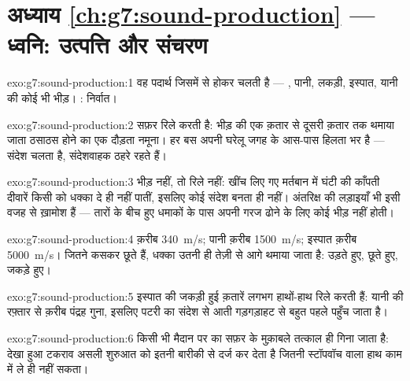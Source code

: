 \section*{अध्याय \ref{ch:g7:sound-production} --- ध्वनि: उत्पत्ति और संचरण}

\begin{solution}{exo:g7:sound-production:1}
वह पदार्थ जिसमें से होकर  चलती है --- , पानी, लकड़ी, इस्पात,
यानी  की कोई भी भीड़। : निर्वात।
\end{solution}

\begin{solution}{exo:g7:sound-production:2}
सफ़र रिले करती है: भीड़ की एक क़तार से दूसरी क़तार तक थमाया जाता
ठसाठस होने का एक दौड़ता नमूना। हर  बस अपनी घरेलू जगह के आस-पास
हिलता भर है --- संदेश चलता है, संदेशवाहक ठहरे रहते हैं।
\end{solution}

\begin{solution}{exo:g7:sound-production:3}
भीड़ नहीं, तो रिले नहीं:  खींच लिए गए मर्तबान में घंटी की काँपती
दीवारें किसी को धक्का दे ही नहीं पातीं, इसलिए कोई संदेश बनता ही नहीं।
अंतरिक्ष की लड़ाइयाँ भी इसी वजह से ख़ामोश हैं --- तारों के बीच हुए
धमाकों के पास अपनी गरज ढोने के लिए कोई भीड़ नहीं होती।
\end{solution}

\begin{solution}{exo:g7:sound-production:4}
 क़रीब \qty{340}{m/s}; पानी क़रीब \qty{1500}{m/s}; इस्पात क़रीब
\qty{5000}{m/s}।  जितने कसकर छूते हैं, धक्का उतनी ही तेज़ी से आगे
थमाया जाता है: उड़ते हुए, छूते हुए, जकड़े हुए।
\end{solution}

\begin{solution}{exo:g7:sound-production:5}
इस्पात की जकड़ी हुई क़तारें लगभग हाथों-हाथ रिले करती हैं: यानी  की
रफ़्तार से क़रीब पंद्रह गुना, इसलिए पटरी का संदेश  से आती
गड़गड़ाहट से बहुत पहले पहुँच जाता है।
\end{solution}

\begin{solution}{exo:g7:sound-production:6}
किसी भी मैदान पर  का सफ़र  के मुक़ाबले तत्काल ही गिना जाता
है: देखा हुआ टकराव असली शुरुआत को इतनी बारीकी से दर्ज कर देता है जितनी
स्टॉपवॉच वाला हाथ काम में ले ही नहीं सकता।
\end{solution}

